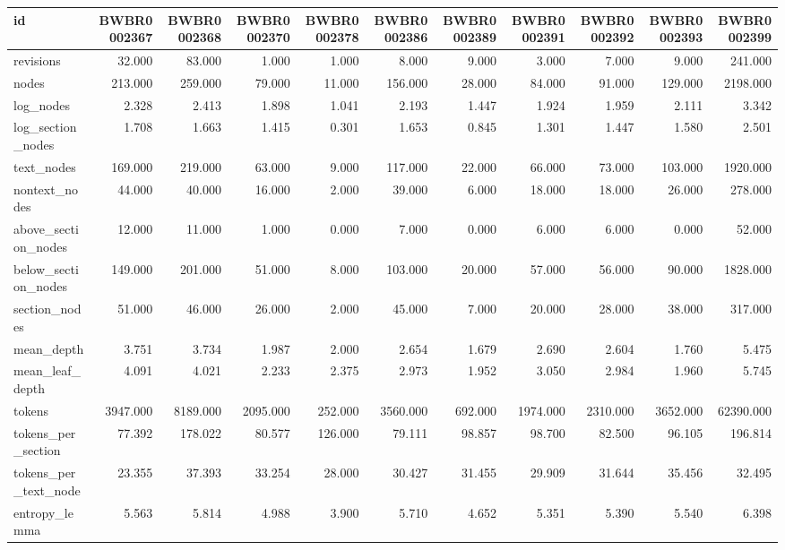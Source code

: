 \begin{tabular}{lrrrrrrrrrr}
\toprule
id & BWBR0002367 & BWBR0002368 & BWBR0002370 & BWBR0002378 & BWBR0002386 & BWBR0002389 & BWBR0002391 & BWBR0002392 & BWBR0002393 & BWBR0002399 \\
\midrule
revisions & 32.000 & 83.000 & 1.000 & 1.000 & 8.000 & 9.000 & 3.000 & 7.000 & 9.000 & 241.000 \\
\cline{1-11}
nodes & 213.000 & 259.000 & 79.000 & 11.000 & 156.000 & 28.000 & 84.000 & 91.000 & 129.000 & 2198.000 \\
\cline{1-11}
log\_nodes & 2.328 & 2.413 & 1.898 & 1.041 & 2.193 & 1.447 & 1.924 & 1.959 & 2.111 & 3.342 \\
\cline{1-11}
log\_section\_nodes & 1.708 & 1.663 & 1.415 & 0.301 & 1.653 & 0.845 & 1.301 & 1.447 & 1.580 & 2.501 \\
\cline{1-11}
text\_nodes & 169.000 & 219.000 & 63.000 & 9.000 & 117.000 & 22.000 & 66.000 & 73.000 & 103.000 & 1920.000 \\
\cline{1-11}
nontext\_nodes & 44.000 & 40.000 & 16.000 & 2.000 & 39.000 & 6.000 & 18.000 & 18.000 & 26.000 & 278.000 \\
\cline{1-11}
above\_section\_nodes & 12.000 & 11.000 & 1.000 & 0.000 & 7.000 & 0.000 & 6.000 & 6.000 & 0.000 & 52.000 \\
\cline{1-11}
below\_section\_nodes & 149.000 & 201.000 & 51.000 & 8.000 & 103.000 & 20.000 & 57.000 & 56.000 & 90.000 & 1828.000 \\
\cline{1-11}
section\_nodes & 51.000 & 46.000 & 26.000 & 2.000 & 45.000 & 7.000 & 20.000 & 28.000 & 38.000 & 317.000 \\
\cline{1-11}
mean\_depth & 3.751 & 3.734 & 1.987 & 2.000 & 2.654 & 1.679 & 2.690 & 2.604 & 1.760 & 5.475 \\
\cline{1-11}
mean\_leaf\_depth & 4.091 & 4.021 & 2.233 & 2.375 & 2.973 & 1.952 & 3.050 & 2.984 & 1.960 & 5.745 \\
\cline{1-11}
tokens & 3947.000 & 8189.000 & 2095.000 & 252.000 & 3560.000 & 692.000 & 1974.000 & 2310.000 & 3652.000 & 62390.000 \\
\cline{1-11}
tokens\_per\_section & 77.392 & 178.022 & 80.577 & 126.000 & 79.111 & 98.857 & 98.700 & 82.500 & 96.105 & 196.814 \\
\cline{1-11}
tokens\_per\_text\_node & 23.355 & 37.393 & 33.254 & 28.000 & 30.427 & 31.455 & 29.909 & 31.644 & 35.456 & 32.495 \\
\cline{1-11}
entropy\_lemma & 5.563 & 5.814 & 4.988 & 3.900 & 5.710 & 4.652 & 5.351 & 5.390 & 5.540 & 6.398 \\

\end{tabular}
